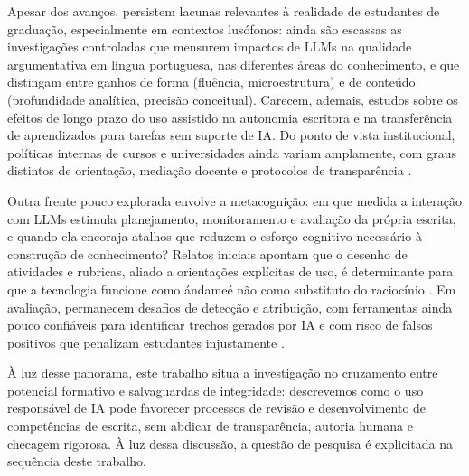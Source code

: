 Apesar dos avanços, persistem lacunas relevantes à realidade de estudantes de graduação, especialmente em contextos lusófonos: ainda são escassas as investigações controladas que mensurem impactos de LLMs na qualidade argumentativa em língua portuguesa, nas diferentes áreas do conhecimento, e que distingam entre ganhos de forma (fluência, microestrutura) e de conteúdo (profundidade analítica, precisão conceitual). Carecem, ademais, estudos sobre os efeitos de longo prazo do uso assistido na autonomia escritora e na transferência de aprendizados para tarefas sem suporte de IA. Do ponto de vista institucional, políticas internas de cursos e universidades ainda variam amplamente, com graus distintos de orientação, mediação docente e protocolos de transparência \cite{unesco2023diretrizes,cope2023ai}.

Outra frente pouco explorada envolve a metacognição: em que medida a interação com LLMs estimula planejamento, monitoramento e avaliação da própria escrita, e quando ela encoraja atalhos que reduzem o esforço cognitivo necessário à construção de conhecimento? Relatos iniciais apontam que o desenho de atividades e rubricas, aliado a orientações explícitas de uso, é determinante para que a tecnologia funcione como \'andame\' e não como substituto do raciocínio . Em avaliação, permanecem desafios de detecção e atribuição, com ferramentas ainda pouco confiáveis para identificar trechos gerados por IA e com risco de falsos positivos que penalizam estudantes injustamente \cite{kobak2025llm}.

À luz desse panorama, este trabalho situa a investigação no cruzamento entre potencial formativo e salvaguardas de integridade: descrevemos como o uso responsável de IA pode favorecer processos de revisão e desenvolvimento de competências de escrita, sem abdicar de transparência, autoria humana e checagem rigorosa. À luz dessa discussão, a questão de pesquisa é explicitada na sequência deste trabalho.
